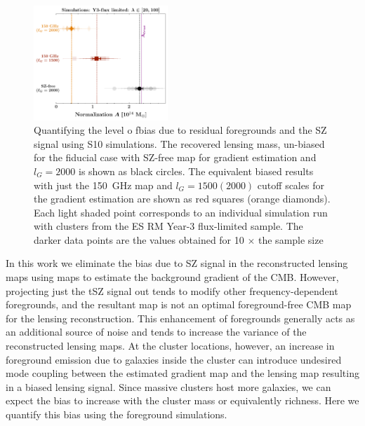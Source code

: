 \begin{figure}
\centering

\includegraphics[width=0.45\textwidth, keepaspectratio]{figs/tsz_bias_checks_sehgal_sims.pdf}
\caption{ Quantifying the level o fbias due to residual foregrounds and the SZ signal using S10 simulations. The recovered lensing mass, un-biased for the fiducial case with SZ-free map for gradient estimation and $l_{G} = 2000$ is shown as black circles. The equivalent biased results with just the 150\, GHz map and $l_{G} = 1500 (2000)$ cutoff scales for the gradient estimation are shown as red squares (orange diamonds). Each light shaded point corresponds to an individual simulation run with clusters from the ES RM Year-3 flux-limited sample. The darker data points are the values obtained for 10 $\times$ the sample size}
\label{fig_QE_sehgal_sims}
\end{figure}

In this work we eliminate the bias due to SZ signal in the reconstructed lensing maps using  maps to estimate the background gradient of the CMB. 
However, projecting just the tSZ signal out tends to modify other frequency-dependent foregrounds, and the resultant map is not an optimal foreground-free CMB map for the lensing reconstruction. 
This enhancement of foregrounds generally acts as an additional source of noise and tends to increase the variance of the reconstructed lensing maps. 
At the cluster locations, however, an increase in foreground emission due to galaxies inside the cluster can introduce undesired mode coupling between the estimated gradient map and the lensing map resulting in a biased lensing signal. 
Since massive clusters host more galaxies, we can expect the bias to increase with the cluster mass or equivalently richness. 
Here we quantify this bias using the  foreground simulations.

